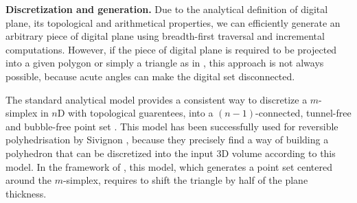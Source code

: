 



\noindent\textbf{Discretization and generation.}
Due to the analytical definition of digital plane, its topological and
arithmetical properties, we can efficiently generate an arbitrary piece
of digital plane using breadth-first traversal and incremental computations.
However, if the piece of digital plane is required to be projected into a
given polygon or simply a triangle as in \cite{LPRJMIV2017}, this approach
is not always possible, because acute angles can make the digital set disconnected. 

The standard analytical model provides a consistent way to discretize a $m$-simplex
in $n$D with topological guarentees, \ie into a $(n-1)$-connected, tunnel-free
and bubble-free point set \cite{Andres2003}. This model has been successfully
used for reversible polyhedrisation by Sivignon \etal \cite{Sivignon2004},
because they precisely find a way of building a polyhedron that can be
discretized into the input 3D volume according to this model.
In the framework of \cite{LPRJMIV2017}, this model, which generates a point set
centered around the $m$-simplex, requires to shift the triangle by half of the
plane thickness.

